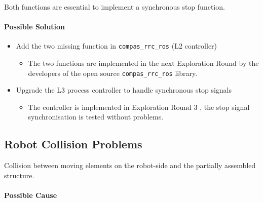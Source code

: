 Both functions are essential to implement a synchronous stop function.

\paragraph{Possible Solution}

\begin{itemize}
    \item Add the two missing function in \verb|compas_rrc_ros| (L2 controller)
    \begin{itemize}
        \item The two functions are implemented in the next Exploration Round by the developers of the open source \verb|compas_rrc_ros| library.
    \end{itemize}
    \item Upgrade the L3 process controller to handle synchronous stop signals
    \begin{itemize}
        \item The controller is implemented in Exploration Round 3 , the stop signal synchronisation is tested without problems. 
    \end{itemize}
\end{itemize}

\subsection{Robot Collision Problems}
\label{subsection:exploration-2-robot-collision-problems}

Collision between moving elements on the robot-side and the partially assembled structure.

\paragraph{Possible Cause}

